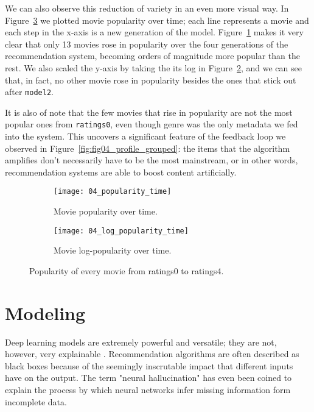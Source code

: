 We can also observe this reduction of variety in an even more visual way. In
Figure~\ref{fig:fig04_popularity_time_both} we plotted movie popularity over
time; each line represents a movie and each step in the x-axis is a new
generation of the model. Figure~\ref{fig:fig04_popularity_time} makes it very
clear that only 13 movies rose in popularity over the four generations of the
recommendation system, becoming orders of magnitude more popular than the rest.
We also scaled the y-axis by taking the its log in
Figure~\ref{fig:fig04_log_popularity_time}, and we can see that, in fact, no
other movie rose in popularity besides the ones that stick out after
\verb|model2|.

It is also of note that the few movies that rise in popularity are not the most
popular ones from \verb|ratings0|, even though genre was the only metadata we
fed into the system. This uncovers a significant feature of the feedback loop we
observed in Figure~\ref{fig:fig04_profile_grouped}: the items that the algorithm
amplifies don't necessarily have to be the most mainstream, or in other words,
recommendation systems are able to boost content artificially.

\begin{figure}
  \centering
  \begin{subfigure}{0.45\textwidth}
    \centering
    \texttt{[image: 04\_popularity\_time]}
    \caption{Movie popularity over time.\label{fig:fig04_popularity_time}}
  \end{subfigure}
  \begin{subfigure}{0.45\textwidth}
    \centering
    \texttt{[image: 04\_log\_popularity\_time]}
    \caption{Movie log-popularity over time.\label{fig:fig04_log_popularity_time}}
  \end{subfigure}
  \caption{Popularity of every movie from ratings0 to ratings4.\label{fig:fig04_popularity_time_both}}
\end{figure}

\section{Modeling}
\label{sec:modeling04}

Deep learning models are extremely powerful and versatile; they are not,
however, very explainable \citep{}. Recommendation algorithms are often %
described as black boxes because of the seemingly inscrutable impact that
different inputs have on the output. The term "neural hallucination" \citep{} %
has even been coined to explain the process by which neural networks infer
missing information form incomplete data.

